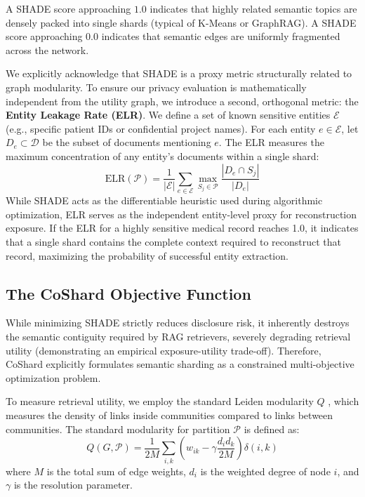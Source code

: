 A SHADE score approaching $1.0$ indicates that highly related semantic topics are densely packed into single shards (typical of K-Means or GraphRAG). A SHADE score approaching $0.0$ indicates that semantic edges are uniformly fragmented across the network. 

We explicitly acknowledge that SHADE is a proxy metric structurally related to graph modularity. To ensure our privacy evaluation is mathematically independent from the utility graph, we introduce a second, orthogonal metric: the \textbf{Entity Leakage Rate (ELR)}. We define a set of known sensitive entities $\mathcal{E}$ (e.g., specific patient IDs or confidential project names). For each entity $e \in \mathcal{E}$, let $D_e \subset \mathcal{D}$ be the subset of documents mentioning $e$. The ELR measures the maximum concentration of any entity's documents within a single shard:
\begin{equation}
\text{ELR}(\mathcal{P}) = \frac{1}{|\mathcal{E}|} \sum_{e \in \mathcal{E}} \max_{S_j \in \mathcal{P}} \frac{|D_e \cap S_j|}{|D_e|}
\end{equation}
While SHADE acts as the differentiable heuristic used during algorithmic optimization, ELR serves as the independent entity-level proxy for reconstruction exposure. If the ELR for a highly sensitive medical record reaches 1.0, it indicates that a single shard contains the complete context required to reconstruct that record, maximizing the probability of successful entity extraction.

\subsection{The CoShard Objective Function}
While minimizing SHADE strictly reduces disclosure risk, it inherently destroys the semantic contiguity required by RAG retrievers, severely degrading retrieval utility (demonstrating an empirical exposure-utility trade-off). Therefore, CoShard explicitly formulates semantic sharding as a constrained multi-objective optimization problem.

To measure retrieval utility, we employ the standard Leiden modularity $Q$ \cite{ng2001spectral}, which measures the density of links inside communities compared to links between communities. The standard modularity for partition $\mathcal{P}$ is defined as:
\begin{equation}
Q(G, \mathcal{P}) = \frac{1}{2M} \sum_{i, k} \left( w_{ik} - \gamma \frac{d_i d_k}{2M} \right) \delta(i, k)
\end{equation}
where $M$ is the total sum of edge weights, $d_i$ is the weighted degree of node $i$, and $\gamma$ is the resolution parameter.

